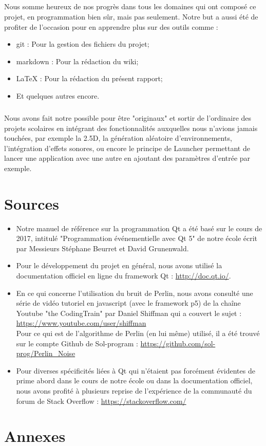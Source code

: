 \documentclass[a4paper,10pt,openany,oneside]{report}
\begin{document}
\paragraph{}
Nous somme heureux de nos progrès dans tous les domaines qui ont composé ce projet, en programmation bien sûr, mais pas seulement. Notre but a aussi été de profiter de l'occasion pour en apprendre plus sur des outils comme :
\begin{itemize}
\item git : Pour la gestion des fichiers du projet;
\item markdown : Pour la rédaction du wiki;
\item LaTeX : Pour la rédaction du présent rapport;
\item Et quelques autres encore.
\end{itemize}
\paragraph{}
Nous avons fait notre possible pour être "originaux" et sortir de l'ordinaire des projets scolaires en intégrant des fonctionnalités auxquelles nous n'avions jamais touchées, par exemple la 2.5D, la génération aléatoire d'environnements, l'intégration d'effets sonores, ou encore le principe de Launcher permettant de lancer une application avec une autre en ajoutant des paramètres d'entrée par exemple.

\chapter{Sources}
\begin{itemize}
\item Notre manuel de référence sur la programmation Qt a été basé sur le cours de 2017, intitulé "Programmation événementielle avec Qt 5" de notre école écrit par Messieurs Stéphane Beurret et David Grunenwald.
\item Pour le développement du projet en général, nous avons utilisé la documentation officiel en ligne du framework Qt : \url{http://doc.qt.io/}.
\item En ce qui concerne l'utilisation du bruit de Perlin, nous avons consulté une série de vidéo tutoriel en javascript (avec le framework p5) de la chaîne Youtube "the CodingTrain" par Daniel Shiffman qui a couvert le sujet : \url{https://www.youtube.com/user/shiffman}\\
Pour ce qui est de l'algorithme de Perlin (en lui même) utilisé, il a été trouvé sur le compte Github de Sol-program :
\url{https://github.com/sol-prog/Perlin_Noise}
\item Pour diverses spécificités liées à Qt qui n'étaient pas forcément évidentes de prime abord dans le cours de notre école ou dans la documentation officiel, nous avons profité à plusieurs reprise de l'expérience de la communauté du forum de Stack Overflow : \url{https://stackoverflow.com/}
\end{itemize}

\chapter{Annexes}
\thispagestyle{headings}
\end{document}
